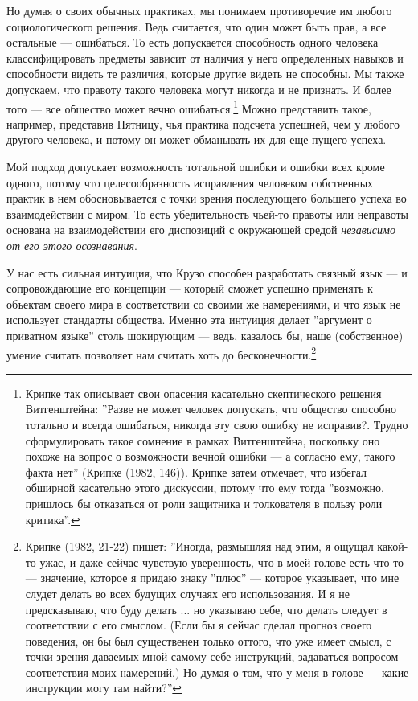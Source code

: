 \documentclass[11pt]{book}
\begin{document}
Но думая о своих обычных практиках, мы понимаем противоречие им любого социологического решения. Ведь считается, что один может быть прав, а все остальные --- ошибаться. То есть допускается способность одного человека классифицировать предметы зависит от наличия у него определенных навыков и способности видеть те различия, которые другие видеть не способны. Мы также допускаем, что правоту такого человека могут никогда и не признать. И более того --- все общество может вечно ошибаться.\footnote{Крипке так описывает свои опасения касательно скептического решения Витгенштейна: ''Разве не может человек допускать, что общество способно тотально и всегда ошибаться, никогда эту свою ошибку не исправив?. Трудно сформулировать такое сомнение в рамках Витгенштейна, поскольку оно похоже на вопрос о возможности вечной ошибки --- а согласно ему, такого факта нет'' (Крипке (1982, 146)). Крипке затем отмечает, что избегал обширной касательно этого дискуссии, потому что ему тогда ''возможно, пришлось бы отказаться от роли защитника и толкователя в пользу роли критика''.} Можно представить такое, например, представив Пятницу, чья практика подсчета успешней, чем у любого другого человека, и потому он может обманывать их для еще пущего успеха.

Мой подход допускает возможность тотальной ошибки и ошибки всех кроме одного, потому что целесообразность исправления человеком собственных практик в нем обосновывается с точки зрения последующего большего успеха во взаимодействии с миром. То есть убедительность чьей-то правоты или неправоты основана на взаимодействии его диспозиций с окружающей средой \textit{независимо от его этого осознавания}.

У нас есть сильная интуиция, что Крузо способен разработать связный язык --- и сопровождающие его концепции --- который сможет успешно применять к объектам своего мира в соответствии со своими же намерениями, и что язык не использует стандарты общества. Именно эта интуиция делает ''аргумент о приватном языке'' столь шокирующим --- ведь, казалось бы, наше (собственное) умение считать позволяет нам считать хоть до бесконечности.\footnote{Крипке (1982, 21-22) пишет: ''Иногда, размышляя над этим, я ощущал какой-то ужас, и даже сейчас чувствую уверенность, что в моей голове есть что-то --- значение, которое я придаю знаку ''плюс'' --- которое указывает, что мне слудет делать во всех будущих случаях его использования. И я не предсказываю, что буду делать ... но указываю себе, что делать следует в соответствии с его смыслом. (Если бы я сейчас сделал прогноз своего поведения, он бы был существенен только оттого, что уже имеет смысл, с точки зрения даваемых мной самому себе инструкций, задаваться вопросом соответствия моих намерений.) Но думая о том, что у меня в голове --- какие инструкции могу там найти?''}
\end{document}

